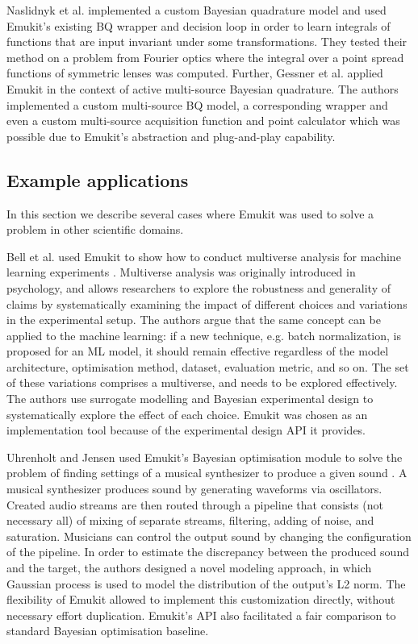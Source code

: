 Naslidnyk et al. \cite{Naslidnyk21} implemented a custom Bayesian quadrature model and used Emukit's existing BQ wrapper and decision loop in order to learn integrals of functions that are input invariant under some transformations. They tested their method on a problem from Fourier optics where the integral over a point spread functions of symmetric lenses was computed. Further, Gessner et al. \cite{Gessner20} applied Emukit in the context of active multi-source Bayesian quadrature. The authors implemented a custom multi-source BQ model, a corresponding wrapper and even a custom multi-source acquisition function and point calculator which was possible due to Emukit's abstraction and plug-and-play capability.

\subsection{Example applications}
In this section we describe several cases where Emukit was used to solve a problem in other scientific domains.

Bell et al. used Emukit to show how to conduct multiverse analysis for machine learning experiments \cite{bell2022modeling}. Multiverse analysis was originally introduced in psychology, and allows researchers to explore the robustness and generality of claims by systematically examining the impact of different choices and variations in the experimental setup. The authors argue that the same concept can be applied to the machine learning: if a new technique, e.g. batch normalization, is proposed for an ML model, it should remain effective regardless of the model architecture, optimisation method, dataset, evaluation metric, and so on. The set of these variations comprises a multiverse, and needs to be explored effectively. The authors use surrogate modelling and Bayesian experimental design to systematically explore the effect of each choice. Emukit was chosen as an implementation tool because of the experimental design API it provides.

Uhrenholt and Jensen used Emukit's Bayesian optimisation module to solve the problem of finding settings of a musical synthesizer to produce a given sound \cite{uhrenholt2019efficient}. A musical synthesizer produces sound by generating waveforms via oscillators. Created audio streams are then routed through a pipeline that consists (not necessary all) of mixing of separate streams, filtering, adding of noise, and saturation. Musicians can control the output sound by changing the configuration of the pipeline. In order to estimate the discrepancy between the produced sound and the target, the authors designed a novel modeling approach, in which Gaussian process is used to model the distribution of the output's L2 norm. The flexibility of Emukit allowed to implement this customization directly, without necessary effort duplication. Emukit's API also facilitated a fair comparison to standard Bayesian optimisation baseline.

